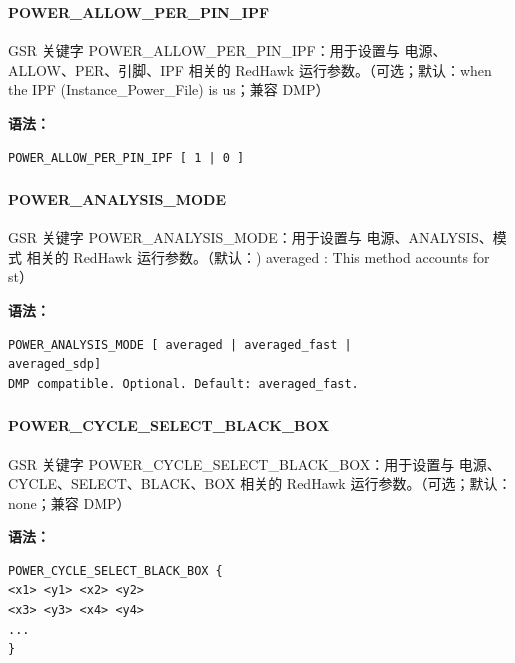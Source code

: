 \subsubsection{}
\paragraph*{POWER_ALLOW_PER_PIN_IPF}

GSR 关键字 POWER_ALLOW_PER_PIN_IPF：用于设置与 电源、ALLOW、PER、引脚、IPF 相关的 RedHawk 运行参数。（可选；默认：when the IPF (Instance_Power_File) is us；兼容 DMP）

\textbf{语法：}
\begin{lstlisting}
POWER_ALLOW_PER_PIN_IPF [ 1 | 0 ]
\end{lstlisting}

\subsubsection{}
\paragraph*{POWER_ANALYSIS_MODE}

GSR 关键字 POWER_ANALYSIS_MODE：用于设置与 电源、ANALYSIS、模式 相关的 RedHawk 运行参数。（默认：) averaged : This method accounts for st）

\textbf{语法：}
\begin{lstlisting}
POWER_ANALYSIS_MODE [ averaged | averaged_fast |
averaged_sdp]
DMP compatible. Optional. Default: averaged_fast.
\end{lstlisting}

\subsubsection{}
\paragraph*{POWER_CYCLE_SELECT_BLACK_BOX}

GSR 关键字 POWER_CYCLE_SELECT_BLACK_BOX：用于设置与 电源、CYCLE、SELECT、BLACK、BOX 相关的 RedHawk 运行参数。（可选；默认：none；兼容 DMP）

\textbf{语法：}
\begin{lstlisting}
POWER_CYCLE_SELECT_BLACK_BOX {
<x1> <y1> <x2> <y2>
<x3> <y3> <x4> <y4>
...
}
\end{lstlisting}

